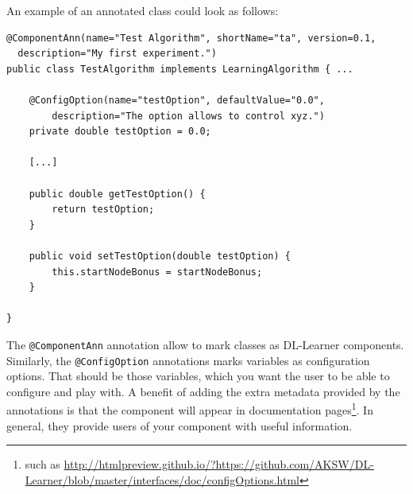 \documentclass[a4paper,12pt]{scrartcl}
\begin{document}
An example of an annotated class could look as follows:

\begin{verbatim}
@ComponentAnn(name="Test Algorithm", shortName="ta", version=0.1, 
  description="My first experiment.")
public class TestAlgorithm implements LearningAlgorithm { ...

    @ConfigOption(name="testOption", defaultValue="0.0", 
        description="The option allows to control xyz.")
    private double testOption = 0.0;

    [...]

    public double getTestOption() {
        return testOption;
    }

    public void setTestOption(double testOption) {
        this.startNodeBonus = startNodeBonus;
    }

}
\end{verbatim}

The \verb|@ComponentAnn| annotation allow to mark classes as DL-Learner components. Similarly, the \verb|@ConfigOption| annotations marks variables as configuration options. That should be those variables, which you want the user to be able to configure and play with. A benefit of adding the extra metadata provided by the annotations is that the component will appear in documentation pages\footnote{such as \url{http://htmlpreview.github.io/?https://github.com/AKSW/DL-Learner/blob/master/interfaces/doc/configOptions.html}}. In general, they provide users of your component with useful information.
\end{document}
